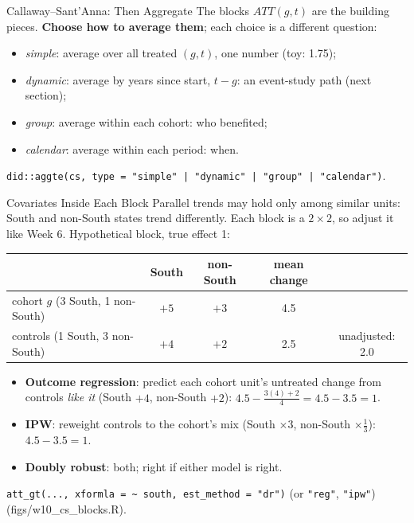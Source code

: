\documentclass[aspectratio=169,11pt,xcolor=dvipsnames]{beamer}
\newcommand{\srcp}[1]{{\scriptsize\color{gray}(#1)}}
\begin{document}
\begin{frame}{Callaway--Sant'Anna: Then Aggregate}
The blocks $ATT(g,t)$ are the building pieces. \textbf{Choose how to average them}; each choice
is a different question:
\vskip4pt
\begin{itemize}\itemsep3pt
  \item \emph{simple}: average over all treated $(g,t)$, one number (toy: 1.75);
  \item \emph{dynamic}: average by years since start, $t-g$: an event-study path (next section);
  \item \emph{group}: average within each cohort: who benefited;
  \item \emph{calendar}: average within each period: when.
\end{itemize}
\vskip4pt
\texttt{did::aggte(cs, type = "simple" | "dynamic" | "group" | "calendar")}.
\end{frame}

\begin{frame}{Covariates Inside Each Block}
Parallel trends may hold only among similar units: South and non-South states trend differently.
Each block is a $2\times2$, so adjust it like Week 6. Hypothetical block, true effect 1:
\vskip3pt
\begin{center}\small
\renewcommand{\arraystretch}{1.1}
\begin{tabular}{@{}lcccc@{}}
\toprule
 & South & non-South & mean change & \\
\midrule
cohort $g$ (3 South, 1 non-South) & $+5$ & $+3$ & 4.5 & \\
controls (1 South, 3 non-South) & $+4$ & $+2$ & 2.5 & unadjusted: \alert{2.0} \\
\bottomrule
\end{tabular}
\end{center}
\vskip3pt
\begin{itemize}\itemsep2pt
  \item \textbf{Outcome regression}: predict each cohort unit's untreated change from controls
        \emph{like it} (South $+4$, non-South $+2$): $4.5 - \tfrac{3(4) + 2}{4} = 4.5 - 3.5 = 1$.
  \item \textbf{IPW}: reweight controls to the cohort's mix (South $\times 3$, non-South
        $\times \tfrac13$): $4.5 - 3.5 = 1$.
  \item \textbf{Doubly robust}: both; right if either model is right.
\end{itemize}
\vskip2pt
\texttt{att\_gt(..., xformla = \textasciitilde{} south, est\_method = "dr")} (or \texttt{"reg"}, \texttt{"ipw"})
\srcp{figs/w10\_cs\_blocks.R}.
\end{frame}
\end{document}
